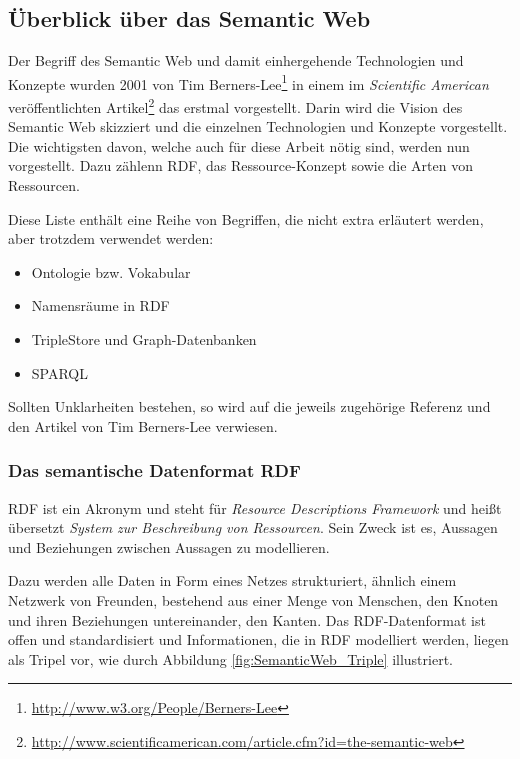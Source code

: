 \documentclass[11pt]{article}
\newcommand{\com}[1]{\marginpar{\em {\small{#1}}}} %
\begin{document}
%
%
\subsection{Überblick über das Semantic Web}
\label{sec:chapterBasicsSemanticWeb}

Der Begriff des Semantic Web und damit einhergehende Technologien und Konzepte wurden 2001 von Tim Berners-Lee\footnote{\url{http://www.w3.org/People/Berners-Lee}} in einem im \textit{Scientific American} veröffentlichten Artikel\footnote{\url{http://www.scientificamerican.com/article.cfm?id=the-semantic-web}} das erstmal vorgestellt. Darin wird die Vision des Semantic Web skizziert und die einzelnen Technologien und Konzepte vorgestellt. Die wichtigsten davon, welche auch für diese Arbeit nötig sind, werden nun vorgestellt. Dazu zählenn RDF, das Ressource-Konzept sowie die Arten von Ressourcen. 

Diese Liste enthält eine Reihe von Begriffen, die nicht extra erläutert werden, aber trotzdem verwendet werden:

\begin{itemize}
\setlength{\itemsep}{0mm}
    \item Ontologie bzw. Vokabular \cite{ONTOLOGY}
    \item Namensräume in RDF \cite{NAMESPACE-XML}
    \item TripleStore und Graph-Datenbanken \cite{GRAPH-DB}
    \item SPARQL \cite{SPARQL-SPEC}
\end{itemize}

Sollten Unklarheiten bestehen, so wird auf die jeweils zugehörige Referenz und den Artikel von Tim Berners-Lee verwiesen.


%
%
\subsubsection{Das semantische Datenformat RDF} 

RDF\com{RDF}\cite{RDF-SPEC} ist ein Akronym und steht für \textit{Resource Descriptions Framework} und heißt übersetzt \textit{System zur Beschreibung von Ressourcen}. Sein Zweck ist es, Aussagen und Beziehungen zwischen Aussagen zu modellieren. 

\newpage
\noindent
Dazu werden alle Daten in Form eines Netzes strukturiert, ähnlich einem Netzwerk von Freunden, bestehend aus einer Menge von Menschen, den Knoten und ihren Beziehungen untereinander, den Kanten. Das RDF-Datenformat ist offen und standardisiert und Informationen, die in RDF modelliert werden, liegen als Tripel vor, wie durch Abbildung \ref{fig:SemanticWeb_Triple} illustriert. \\
\end{document}

